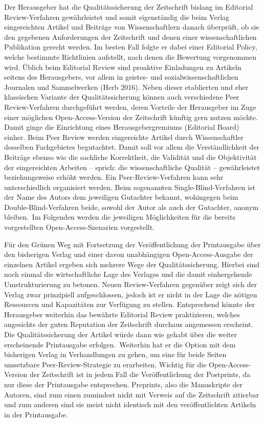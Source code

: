 \documentclass[a4paper,
fontsize=11pt,
oneside,
numbers=noperiodatend,
parskip=half-,
bibliography=totoc,
final
]{scrartcl}
\begin{document}
Der Herausgeber hat die Qualitätssicherung der Zeitschrift bislang im
Editorial Review-Ver\-fahr\-en gewährleistet und somit eigenständig die beim
Verlag eingereichten Artikel und Beiträge von Wissenschaftlern danach
überprüft, ob sie den gegebenen Anforderungen der Zeitschrift und denen
einer wissenschaftlichen Publikation gerecht werden. Im besten Fall
folgte er dabei einer Editorial Policy, welche bestimmte Richtlinien
aufstellt, nach denen die Bewertung vorgenommen wird. Üblich beim
Editorial Review sind proaktive Einladungen zu Artikeln seitens des
Herausgebers, vor allem in geistes- und sozialwissenschaftlichen
Journalen und Sammelwerken (Herb 2016). Neben dieser etablierten und
eher klassischen Variante der Qualitätssicherung können auch
verschiedene Peer Review-Verfahren durchgeführt werden, deren Vorteile
der Herausgeber im Zuge einer möglichen Open-Access-Version der
Zeitschrift künftig gern nutzen möchte. Damit ginge die Einrichtung
eines Herausgebergremiums (Editorial Board) einher. Beim Peer Review
werden eingereichte Artikel durch Wissenschaftler desselben Fachgebietes
begutachtet. Damit soll vor allem die Verständlichkeit der Beiträge
ebenso wie die sachliche Korrektheit, die Validität und die Objektivität
der eingereichten Arbeiten -- sprich: die wissenschaftliche Qualität --
gewährleistet beziehungsweise erhöht werden. Ein Peer-Review-Verfahren
kann sehr unterschiedlich organisiert werden. Beim sogenannten
Single-Blind-Verfahren ist der Name des Autors dem jeweiligen Gutachter
bekannt, wohingegen beim Double-Blind-Verfahren beide, sowohl der Autor
als auch der Gutachter, anonym bleiben.~Im Folgenden werden die
jeweiligen Möglichkeiten für die bereits vorgestellten
Open-Access-Szenarien vorgestellt.

Für den Grünen Weg mit Fortsetzung der Veröffentlichung der Printausgabe
über den bisherigen Verlag und einer davon unabhängigen
Open-Access-Ausgabe der einzelnen Artikel ergeben sich mehrere Wege der
Qualitätssicherung. Hierbei sind noch einmal die wirtschaftliche Lage
des Verlages und die damit einhergehende Umstrukturierung zu betonen.
Neuen Review-Verfahren gegenüber zeigt sich der Verlag zwar prinzipiell
aufgeschlossen, jedoch ist er nicht in der Lage die nötigen Ressourcen
und Kapazitäten zur Verfügung zu stellen. Entsprechend könnte der
Herausgeber weiterhin das bewährte Editorial Review praktizieren,
welches angesichts der guten Reputation der Zeitschrift durchaus
angemessen erscheint. Die Qualitätssicherung der Artikel würde dann wie
gehabt über die weiter erscheinende Printausgabe erfolgen.~Weiterhin hat
er die Option mit dem bisherigen Verlag in Verhandlungen zu gehen, um
eine für beide Seiten umsetzbare Peer-Review-Strategie zu erarbeiten.
Wichtig für die Open-Access-Version der Zeitschrift ist in jedem Fall
die Veröffentlichung der Postprints, da nur diese der Printausgabe
entsprechen. Preprints, also die Manuskripte der Autoren, sind zum einen
zumindest nicht mit Verweis auf die Zeitschrift zitierbar und zum
anderen sind sie meist nicht identisch mit den veröffentlichten Artikeln
in der Printausgabe.
\end{document}
